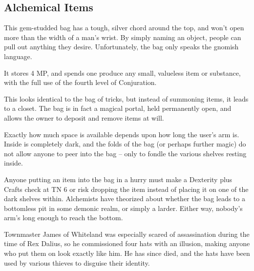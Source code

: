 \begin{multicols}{2}

\subsection{Alchemical Items}


\noindent This gem-studded bag has a tough, silver chord around the top, and won't open more than the width of a man's wrist.  By simply naming an object, people can pull out anything they desire.  Unfortunately, the bag only speaks the gnomish language.

It stores 4 MP, and spends one produce any small, valueless item or substance, with the full use of the fourth level of Conjuration.


This looks identical to the bag of tricks, but instead of summoning items, it leads to a closet.
The bag is in fact a magical portal, held permanently open, and allows the owner to deposit and remove items at will.

Exactly how much space is available depends upon how long the user's arm is.  Inside is completely dark, and the folds of the bag (or perhaps further magic) do not allow anyone to peer into the bag -- only to fondle the various shelves resting inside.

Anyone putting an item into the bag in a hurry must make a Dexterity plus Crafts check at TN 6 or risk dropping the item instead of placing it on one of the dark shelves within.  Alchemists have theorized about whether the bag leads to a bottomless pit in some demonic realm, or simply a larder.  Either way, nobody's arm's long enough to reach the bottom.


\noindent Townmaster James of Whiteland was especially scared of assassination during the time of Rex Dalius, so he commissioned four hats with an illusion, making anyone who put them on look exactly like him.
He has since died, and the hats have been used by various thieves to disguise their identity.

\label{portalscroll}


\end{multicols}
